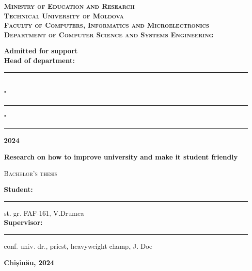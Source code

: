 \begin{titlepage}
	
	\begin{center}
		\large{\textsc{\textbf{Ministry of Education and Research \\
			                   Technical University of Moldova \\
		                       Faculty of Computers, Informatics and Microelectronics \\
	                           Department of Computer Science and Systems Engineering}}}
		\vspace{1.5cm}
	\end{center}
	
	
	\hfill
	\begin{minipage}{0.4\textwidth}
		\raggedright
		\textbf{Admitted for support} \\
		\textbf{Head of department:} \\
		\rule{5.5cm}{0.05cm} \\
		"\rule{1cm}{0.05cm}"\rule{3cm}{0.05cm} \textbf{2024}
	\end{minipage}
	\vspace{2cm}	
	
	
	\begin{center}
		\LARGE{\textbf{Research on how to improve university and make it student friendly}}
		
		\vspace{1cm}
		
		\large{\textsc{Bachelor's thesis}}
	\end{center}
	\vspace{1.5cm}
	
	
	\hfill
	\begin{minipage}{0.5\textwidth}
		\raggedright
		\textbf{Student:} \rule{2cm}{0.05cm} st. gr. FAF-161, V.Drumea \\
		\textbf{Supervisor:} \rule{2cm}{0.05cm} conf. univ. dr., priest, heavyweight champ, J. Doe \\
	\end{minipage}
	\vspace{2cm}
	
	\vfill
	\begin{center}
		\large{\textbf{Chișinău, 2024}}
	\end{center}

\end{titlepage}